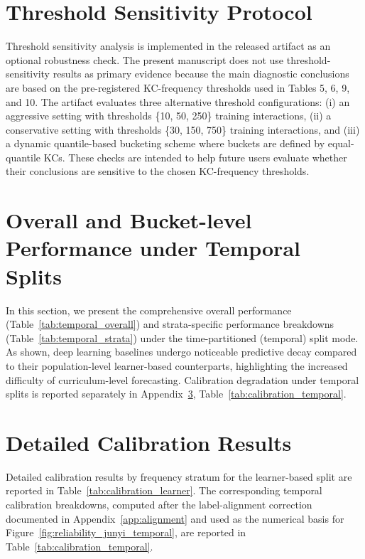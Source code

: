 \section{Threshold Sensitivity Protocol}
\label{app:sensitivity}
Threshold sensitivity analysis is implemented in the released artifact as an optional robustness check. The present manuscript does not use threshold-sensitivity results as primary evidence because the main diagnostic conclusions are based on the pre-registered KC-frequency thresholds used in Tables 5, 6, 9, and 10. The artifact evaluates three alternative threshold configurations: (i) an aggressive setting with thresholds \{10, 50, 250\} training interactions, (ii) a conservative setting with thresholds \{30, 150, 750\} training interactions, and (iii) a dynamic quantile-based bucketing scheme where buckets are defined by equal-quantile KCs. These checks are intended to help future users evaluate whether their conclusions are sensitive to the chosen KC-frequency thresholds.

\FloatBarrier

\section{Overall and Bucket-level Performance under Temporal Splits}
\label{app:temporal_performance}
In this section, we present the comprehensive overall performance (Table~\ref{tab:temporal_overall}) and strata-specific performance breakdowns (Table~\ref{tab:temporal_strata}) under the time-partitioned (temporal) split mode. As shown, deep learning baselines undergo noticeable predictive decay compared to their population-level learner-based counterparts, highlighting the increased difficulty of curriculum-level forecasting. Calibration degradation under temporal splits is reported separately in Appendix~\ref{app:calibration_performance}, Table~\ref{tab:calibration_temporal}.




\clearpage
\section{Detailed Calibration Results}
\label{app:calibration_performance}
Detailed calibration results by frequency stratum for the learner-based split are reported in Table~\ref{tab:calibration_learner}. The corresponding temporal calibration breakdowns, computed after the label-alignment correction documented in Appendix~\ref{app:alignment} and used as the numerical basis for Figure~\ref{fig:reliability_junyi_temporal}, are reported in Table~\ref{tab:calibration_temporal}.

